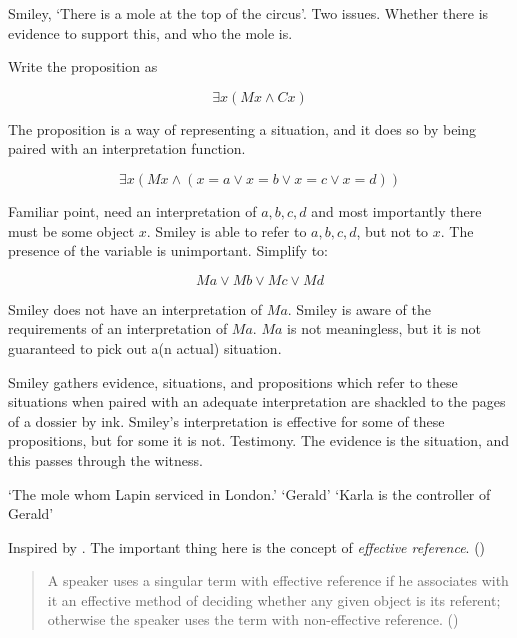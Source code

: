 \documentclass[10pt]{article}
\begin{document}
Smiley,
`There is a mole at the top of the circus'.
Two issues.
Whether there is evidence to support this, and who the mole is.

Write the proposition as

\[\exists x(Mx \land Cx)\]



The proposition is a way of representing a situation, and it does so by being paired with an interpretation function.


\[\exists x(Mx \land (x = a \lor x = b \lor x = c \lor x = d))\]

Familiar point, need an interpretation of \(a, b, c, d\) and most importantly there must be some object \(x\).
Smiley is able to refer to \(a, b, c, d\), but not to \(x\).
The presence of the variable is unimportant.
Simplify to:

\[Ma \lor Mb \lor Mc \lor Md\]

Smiley does not have an interpretation of \(Ma\).
Smiley is aware of the requirements of an interpretation of \(Ma\).
\(Ma\) is not meaningless, but it is not guaranteed to pick out a(n actual) situation.






Smiley gathers evidence, situations, and propositions which refer to these situations when paired with an adequate interpretation are shackled to the pages of a dossier by ink.
Smiley's interpretation is effective for some of these propositions, but for some it is not.
Testimony.
The evidence is the situation, and this passes through the witness.




`The mole whom Lapin serviced in London.'
`Gerald'
`Karla is the controller of Gerald'












Inspired by \textcite{Over:1983aa}.
The important thing here is the concept of \emph{effective reference}. (\cite{Over:1983ab})

\begin{quote}
  A speaker uses a singular term with effective reference if he associates with it an effective method of deciding whether any given object is its referent; otherwise the speaker uses the term with non-effective reference.\nolinebreak
  \mbox{}\hfill\mbox{(\citeyear[86]{Over:1983ab})}
\end{quote}
\end{document}
